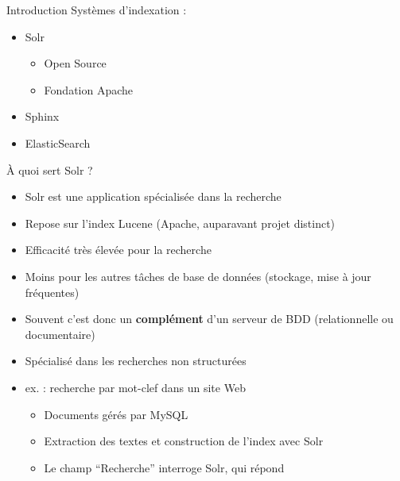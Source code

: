 \begin{frame}{Introduction}
  Systèmes d'indexation :
  \begin{itemize}
    \item Solr 
      \begin{itemize}
        \item Open Source
        \item Fondation Apache
      \end{itemize}
    \item Sphinx
    \item ElasticSearch
  \end{itemize}
  \medskip {}
      

\end{frame}

\begin{frame}{À quoi sert Solr ?}
  \begin{itemize}
    \item Solr est une application spécialisée dans la recherche
    \item Repose sur l'index Lucene (Apache, auparavant projet distinct)
      \medskip
    \item Efficacité très élevée pour la recherche
    \item Moins pour les autres tâches de base de données (stockage, mise à jour
      fréquentes)
    \item Souvent c'est donc un {\bf complément} d'un serveur de BDD
      (relationnelle ou documentaire)
    \item Spécialisé dans les recherches non structurées
        \item ex. : recherche par mot-clef dans un site Web
          \begin{itemize}
            \item Documents gérés par MySQL
            \item Extraction des textes et construction de l'index avec Solr
            \item Le champ ``Recherche'' interroge Solr, qui répond
          \end{itemize}
  \end{itemize}
\end{frame} %

